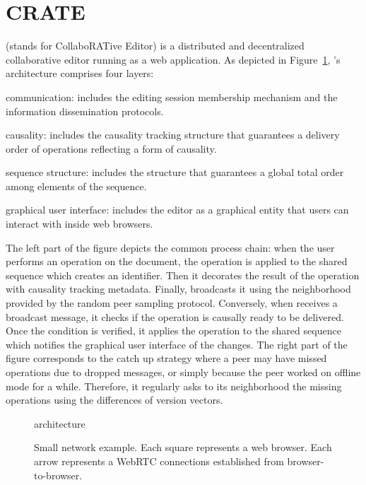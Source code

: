 
\section{CRATE}
\label{sec:proposal}

\CRATE (stands for CollaboRATive Editor) is a distributed and decentralized
collaborative editor running as a web application. As depicted in
Figure~\ref{fig:architecture}, \CRATE's architecture comprises four layers:
\begin{inparaenum}[(i)]
\item communication: includes the editing session membership mechanism and the
  information dissemination protocols.
\item causality: includes the causality tracking structure that guarantees a
  delivery order of operations reflecting a form of causality.
\item sequence structure: includes the structure that guarantees a global
  total order among elements of the sequence.
\item graphical user interface: includes the editor as a graphical entity that
  users can interact with inside web browsers.
\end{inparaenum}
The left part of the figure depicts the common process chain: when the user
performs an operation on the document, the operation is applied to the shared
sequence which creates an \LSEQ identifier. Then it decorates the result of the
operation with causality tracking metadata. Finally, \CRATE broadcasts it using
the neighborhood provided by the \SPRAY random peer sampling protocol.
Conversely, when \CRATE receives a broadcast message, it checks if the operation
is causally ready to be delivered. Once the condition is verified, it applies
the operation to the shared sequence which notifies the graphical user interface
of the changes.  The right part of the figure corresponds to the catch up
strategy where a peer may have missed operations due to dropped messages, or
simply because the peer worked on offline mode for a while. Therefore, it
regularly asks to its neighborhood the missing operations using the differences
of version vectors.

\begin{figure}
  \centering
  
  \caption{\label{fig:architecture}\CRATE architecture}
\end{figure}

\begin{figure}
  \centering
  
  \caption{\label{fig:network}Small network example. Each square represents a
    web browser. Each arrow represents a WebRTC connections established from
    browser-to-browser. }
\end{figure}

